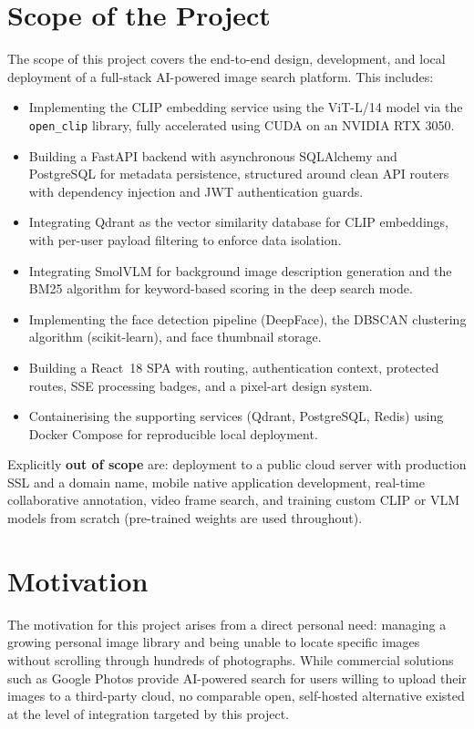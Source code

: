 \documentclass[12pt,a4paper,oneside]{report}
\begin{document}
\section{Scope of the Project}
The scope of this project covers the end-to-end design, development, and
local deployment of a full-stack AI-powered image search platform.  This
includes:
\begin{itemize}[leftmargin=*]
  \item Implementing the CLIP embedding service using the ViT-L/14 model
        via the \texttt{open\_clip} library, fully accelerated using CUDA on an NVIDIA RTX 3050.
  \item Building a FastAPI backend with asynchronous SQLAlchemy and
        PostgreSQL for metadata persistence, structured around clean API
        routers with dependency injection and JWT authentication guards.
  \item Integrating Qdrant as the vector similarity database for CLIP
        embeddings, with per-user payload filtering to enforce data isolation.
  \item Integrating SmolVLM for background image description generation and
        the BM25 algorithm for keyword-based scoring in the deep search mode.
  \item Implementing the face detection pipeline (DeepFace), the DBSCAN
        clustering algorithm (scikit-learn), and face thumbnail storage.
  \item Building a React~18 SPA with routing, authentication context,
        protected routes, SSE processing badges, and a pixel-art design system.

  \item Containerising the supporting services (Qdrant, PostgreSQL, Redis)
        using Docker Compose for reproducible local deployment.
\end{itemize}

Explicitly \textbf{out of scope} are: deployment to a public cloud server
with production SSL and a domain name, mobile native application development,
real-time collaborative annotation, video frame search, and training
custom CLIP or VLM models from scratch (pre-trained weights are used
throughout).

\section{Motivation}
The motivation for this project arises from a direct personal need: managing
a growing personal image library and being unable to locate specific images
without scrolling through hundreds of photographs. While commercial solutions
such as Google Photos provide AI-powered search for users willing to upload
their images to a third-party cloud, no comparable open, self-hosted
alternative existed at the level of integration targeted by this project.
\end{document}
